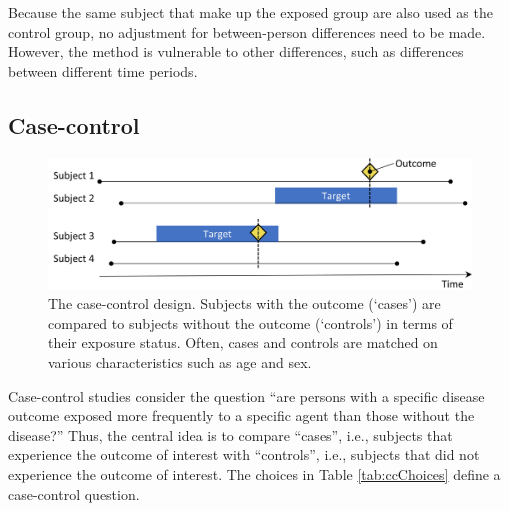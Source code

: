 \documentclass[11pt]{book}
\begin{document}
Because the same subject that make up the exposed group are also used as
the control group, no adjustment for between-person differences need to
be made. However, the method is vulnerable to other differences, such as
differences between different time periods.

\subsection{Case-control}\label{case-control}

\begin{figure}

{\centering \includegraphics[width=0.9\linewidth]{images/PopulationLevelEstimation/caseControl} 

}

\caption{The case-control design. Subjects with the outcome (‘cases’) are compared to subjects without the outcome (‘controls’) in terms of their exposure status. Often, cases and controls are matched on various characteristics such as age and sex.}\label{fig:caseControl}
\end{figure}

Case-control \citep{vandenbroucke_2012} studies consider the question
``are persons with a specific disease outcome exposed more frequently to
a specific agent than those without the disease?'' Thus, the central
idea is to compare ``cases'', i.e., subjects that experience the outcome
of interest with ``controls'', i.e., subjects that did not experience
the outcome of interest. The choices in Table \ref{tab:ccChoices} define
a case-control question.
\end{document}
